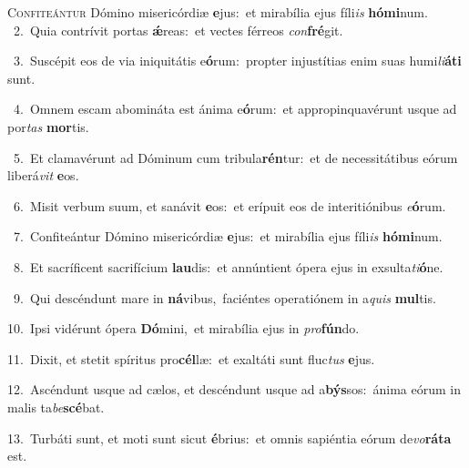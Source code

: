 \lettrine{\initial\textcolor{\initialcolor}{C}}{onfiteántur} Dómino misericórdiæ \textbf{e}\-jus:~\star et mirabília ejus fíli\textit{is} \textbf{hó}\-\textbf{mi}num.\\
{\numbfont\textcolor{\numbcolor}{~2.}}~Quia contrívit portas \textbf{ǽ}\-reas:~\star et vectes férreos \textit{con}\-\textbf{fré}git.\par
{\numbfont\textcolor{\numbcolor}{~3.}}~Suscépit eos de via iniquitátis e\-\textbf{ó}\-rum:~\star propter injustítias enim suas humi\-\textit{li}\-\textbf{á}\textbf{ti} sunt.\par
{\numbfont\textcolor{\numbcolor}{~4.}}~Omnem escam abomináta est ánima e\-\textbf{ó}\-rum:~\star et appropinquavérunt usque ad por\textit{tas} \textbf{mor}\-tis.\par
{\numbfont\textcolor{\numbcolor}{~5.}}~Et clamavérunt ad Dóminum cum tribula\-\textbf{rén}\-tur:~\star et de necessitátibus eórum liberá\textit{vit} \textbf{e}\-os.\par
{\numbfont\textcolor{\numbcolor}{~6.}}~Misit verbum suum, et sanávit \textbf{e}\-os:~\star et erípuit eos de interitiónibus \textit{e}\-\textbf{ó}rum.\par
{\numbfont\textcolor{\numbcolor}{~7.}}~Confiteántur Dómino misericórdiæ \textbf{e}\-jus:~\star et mirabília ejus fíli\textit{is} \textbf{hó}\-\textbf{mi}num.\par
{\numbfont\textcolor{\numbcolor}{~8.}}~Et sacríficent sacrifícium \textbf{lau}\-dis:~\star et annúntient ópera ejus in exsulta\-\textit{ti}\-\textbf{ó}ne.\par
{\numbfont\textcolor{\numbcolor}{~9.}}~Qui descéndunt mare in \textbf{ná}\-vibus,~\star faciéntes operatiónem in a\textit{quis} \textbf{mul}\-tis.\par
{\numbfont\textcolor{\numbcolor}{10.}}~Ipsi vidérunt ópera \textbf{Dó}\-mini,~\star et mirabília ejus in \textit{pro}\-\textbf{fún}do.\par
{\numbfont\textcolor{\numbcolor}{11.}}~Dixit, et stetit spíritus pro\-\textbf{cél}\-læ:~\star et exaltáti sunt fluc\textit{tus} \textbf{e}\-jus.\par
{\numbfont\textcolor{\numbcolor}{12.}}~Ascéndunt usque ad cælos, et descéndunt usque ad a\-\textbf{býs}\-sos:~\star ánima eórum in malis ta\-\textit{be}\-\textbf{scé}bat.\par
{\numbfont\textcolor{\numbcolor}{13.}}~Turbáti sunt, et moti sunt sicut \textbf{é}\-brius:~\star et omnis sapiéntia eórum de\-\textit{vo}\-\textbf{rá}\textbf{ta} est.\par
